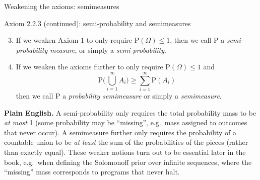 \documentclass[aspectratio=169,10pt]{beamer}
\begin{document}
\begin{frame}{Weakening the axioms: semimeasures}
\begin{block}{Axiom 2.2.3 (continued): semi-probability and semimeasures}
\begin{enumerate}
\setcounter{enumi}{2}
\item If we weaken Axiom 1 to only require $\mathrm{P}(\Omega)\leq 1$, then we call $\mathrm{P}$ a \emph{semi-probability measure}, or simply a \emph{semi-probability}.
\item If we weaken the axioms further to only require $\mathrm{P}(\Omega)\leq 1$ and
\[ \mathrm{P}\Big(\bigcup_{i=1}^{\infty}A_i\Big) \geq \sum_{i=1}^{\infty}\mathrm{P}(A_i) \]
then we call $\mathrm{P}$ a \emph{probability semimeasure} or simply a \emph{semimeasure}.
\end{enumerate}
\end{block}
\textbf{Plain English.} A semi-probability only requires the total probability
mass to be \emph{at most} 1 (some probability may be ``missing'', e.g.\ mass
assigned to outcomes that never occur). A semimeasure further only requires
the probability of a countable union to be \emph{at least} the sum of the
probabilities of the pieces (rather than exactly equal). These weaker notions
turn out to be essential later in the book, e.g.\ when defining the
Solomonoff prior over infinite sequences, where the ``missing'' mass
corresponds to programs that never halt.
\end{frame}
\end{document}
